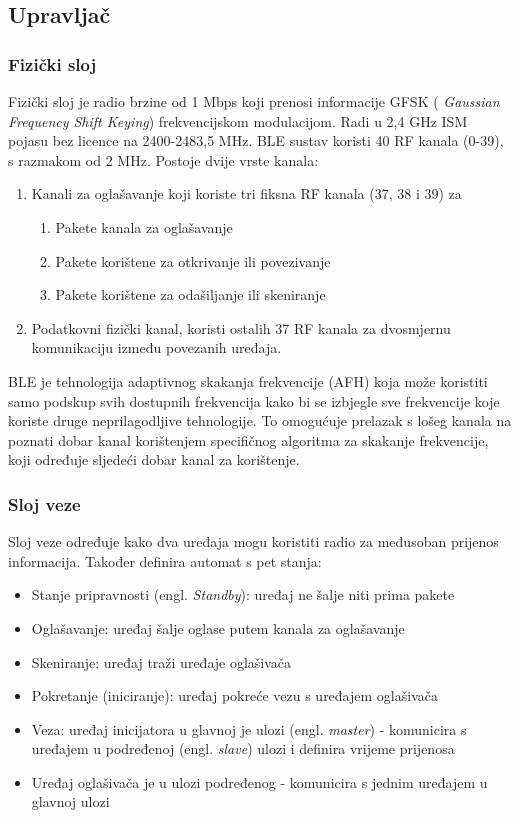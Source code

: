 \subsection{Upravljač}
\subsubsection{Fizički sloj}
Fizički sloj je radio brzine od 1 Mbps koji prenosi informacije GFSK (\textit{ Gaussian Frequency Shift Keying}) frekvencijskom modulacijom. Radi u 2,4 GHz ISM pojasu bez licence na 2400-2483,5 MHz. 
BLE sustav koristi 40 RF kanala (0-39), s razmakom od 2 MHz. Postoje dvije vrste kanala:
\begin{enumerate}
	\item Kanali za oglašavanje koji koriste tri fiksna RF kanala (37, 38 i 39) za
	\begin{enumerate}
		\item Pakete kanala za oglašavanje
		\item Pakete korištene za otkrivanje ili povezivanje
		\item Pakete korištene za odašiljanje ili skeniranje
	\end{enumerate}
	\item Podatkovni fizički kanal, koristi ostalih 37 RF kanala za dvosmjernu komunikaciju između povezanih uređaja.
\end{enumerate}

BLE je tehnologija adaptivnog skakanja frekvencije (AFH) koja može koristiti samo podskup svih dostupnih frekvencija kako bi se izbjegle sve frekvencije koje koriste druge neprilagodljive tehnologije. To omogućuje prelazak s lošeg kanala na poznati dobar kanal korištenjem specifičnog algoritma za skakanje frekvencije, koji određuje sljedeći dobar kanal za korištenje.

\subsubsection{Sloj veze}
Sloj veze određuje kako dva uređaja mogu koristiti radio za međusoban prijenos informacija. Također definira automat s pet stanja:
\begin{itemize}
	\item Stanje pripravnosti (engl. \textit{Standby}): uređaj ne šalje niti prima pakete
	\item Oglašavanje: uređaj šalje oglase putem kanala za oglašavanje
	\item Skeniranje: uređaj traži uređaje oglašivača
	\item Pokretanje (iniciranje): uređaj pokreće vezu s uređajem oglašivača
	\item Veza: uređaj inicijatora u glavnoj je ulozi (engl. \textit{master}) - komunicira s uređajem u podređenoj (engl. \textit{slave}) ulozi i definira vrijeme prijenosa
	\item Uređaj oglašivača je u ulozi podređenog - komunicira s jednim uređajem u glavnoj ulozi 
\end{itemize}

